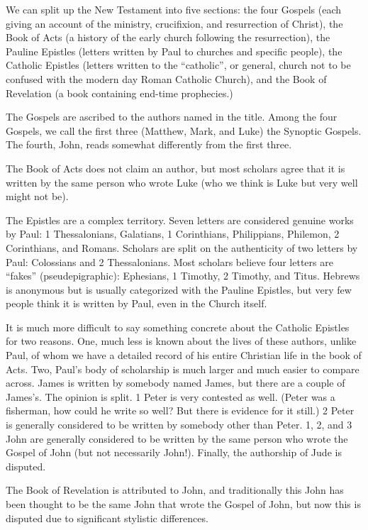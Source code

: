 \documentclass[12pt,letterpaper]{article}
\begin{document}
We can split up the New Testament into five sections: the four Gospels (each giving an account of the ministry, crucifixion, and resurrection of Christ), the Book of Acts (a history of the early church following the resurrection), the Pauline Epistles (letters written by Paul to churches and specific people), the Catholic Epistles (letters written to the ``catholic'', or general, church not to be confused with the modern day Roman Catholic Church), and the Book of Revelation (a book containing end-time prophecies.)

The Gospels are ascribed to the authors named in the title.  Among the four Gospels, we call the first three (Matthew, Mark, and Luke) the Synoptic Gospels.  The fourth, John, reads somewhat differently from the first three.

The Book of Acts does not claim an author, but most scholars agree that it is written by the same person who wrote Luke (who we think is Luke but very well might not be).  

The Epistles are a complex territory.  Seven letters are considered genuine works by Paul: 1 Thessalonians, Galatians, 1 Corinthians, Philippians, Philemon, 2 Corinthians, and Romans.  Scholars are split on the authenticity of two letters by Paul: Colossians and 2 Thessalonians.  Most scholars believe four letters are ``fakes'' (pseudepigraphic): Ephesians, 1 Timothy, 2 Timothy, and Titus.  Hebrews is anonymous but is usually categorized with the Pauline Epistles, but very few people think it is written by Paul, even in the Church itself.

It is much more difficult to say something concrete about the Catholic Epistles for two reasons.  One, much less is known about the lives of these authors, unlike Paul, of whom we have a detailed record of his entire Christian life in the book of Acts.  Two, Paul's body of scholarship is much larger and much easier to compare across.  James is written by somebody named James, but there are a couple of James's.  The opinion is split.  1 Peter is very contested as well.  (Peter was a fisherman, how could he write so well?  But there is evidence for it still.)  2 Peter is generally considered to be written by somebody other than Peter.  1, 2, and 3 John are generally considered to be written by the same person who wrote the Gospel of John (but not necessarily John!).  Finally, the authorship of Jude is disputed.

The Book of Revelation is attributed to John, and traditionally this John has been thought to be the same John that wrote the Gospel of John, but now this is disputed due to significant stylistic differences.  
\end{document}
